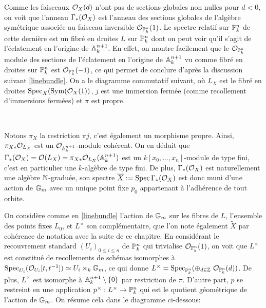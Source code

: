 Comme les faisceaux $\mathcal{O}_X(d)$ n'ont pas de sections globales non nulles pour $d<0$, on voit que l'anneau $\Gamma_*(\mathcal{O}_X)$ est l'anneau des sections globales de l'algèbre symétrique associée au faisceau inversible $\mathcal{O}_{\mathbb{P}^n_k}(1)$. Le spectre relatif sur $\mathbb{P}_k^n$ de cette dernière est un fibré en droites $L$ sur $\mathbb{P}_k^n$ dont on peut voir qu'il s'agit de l'éclatement en l'origine de $\mathbb{A}_k^{n+1}$. En effet, on montre facilement que le $\mathcal{O}_{\mathbb{P}^n_k}$-module des sections de l'éclatement en l'origine de $\mathbb{A}_k^{n+1}$ vu comme fibré en droites sur $\mathbb{P}_k^n$ est $ \mathcal{O}_{\mathbb{P}^n_k}(-1)$, ce qui permet de conclure d'après la discussion suivant \ref{linebundle}. On a le diagramme commutatif suivant, où $L_X$ est le fibré en droites $\operatorname{Spec}_X(\operatorname{Sym}(\mathcal{O}_X(1))$, $j$ est une immersion fermée (comme recollement d'immersions fermées) et $\pi$ est propre.

	\begin{center}
	\\
	\end{center}
Notons $\pi_X$ la restriction $\pi j$, c'est également un morphisme propre. Ainsi, $\pi_{X*}\mathcal{O}_{L_X}$ est un $\mathcal{O}_{\mathbb{A}_k^{n+1}}$-module cohérent. On en déduit que $\Gamma_*(\mathcal{O}_X)=\mathcal{O}(L_X)=\pi_{X*}\mathcal{O}_{L_X}(\mathbb{A}_k^{n+1})$ est un $k[x_0,...,x_n]$-module de type fini, c'est en particulier une $k$-algèbre de type fini. De plus, $\Gamma_*(\mathcal{O}_X)$ est naturellement une algèbre $\mathbb{N}$-graduée, son spectre $\overline{X}:=\operatorname{Spec} \Gamma_*(\mathcal{O}_X)$ est donc muni d'une action de $\mathbb{G}_m$ avec un unique point fixe $p_0$ appartenant à l'adhérence de tout orbite. 

On considère comme en \ref{linebundle} l'action de $\mathbb{G}_m$ sur les fibres de $L$, l'ensemble des points fixes $L_0$, et $L^\times$ son complémentaire, que l'on note également $\widetilde{X}$ par cohérence de notation avec la suite de ce chapitre. En considérant le recouvrement standard $(U_i)_{0\leq i\leq n}$ de $\mathbb{P}^n_k$ qui trivialise $\mathcal{O}_{\mathbb{P}^n_k}(1)$, on voit que $L^\times$ est constitué de recollements de schémas isomorphes à $\operatorname{Spec}_{U_i}( \mathcal{O}_{U_i}[t,t^{-1}])\simeq U_i \times_k \mathbb{G}_m$, ce qui donne $L^\times=\operatorname{Spec}_{\mathbb{P}^n_k}(\oplus_{d\in \mathbb{Z}}\,\,\mathcal{O}_{\mathbb{P}^n_k}(d))$. De plus, $L^\times$ est isomorphe à $\mathbb{A}_k^{n+1}\setminus\lbrace 0 \rbrace$ par restriction de $\pi$. D'autre part, $p$ se restreint en une application $p^\times:L^\times \rightarrow \mathbb{P}^n_k$ qui est le quotient géométrique de l'action de $\mathbb{G}_m$. On résume cela dans le diagramme ci-dessous:

